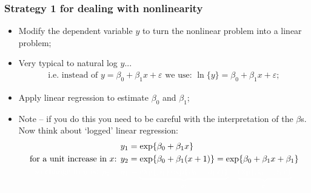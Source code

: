 \documentclass[aspectratio=169]{beamer}
\theoremstyle{principle}
\begin{document}
\begin{frame}
\frametitle{Strategy 1 for dealing with nonlinearity}

\begin{itemize}
\item Modify the dependent variable $y$ to turn the nonlinear problem into a linear problem;
\item Very typical to natural log $y$...
\begin{align*}
\mbox{i.e. instead of }y = \beta_0 + \beta_1x + \varepsilon\mbox{ we use: }\ln\{y\} = \beta_0 + \beta_1x + \varepsilon;
\end{align*}
\item Apply linear regression to estimate $\beta_0$ and $\beta_1$;
\item Note -- if you do this you need to be careful with the interpretation of the $\beta$s.  Now think about `logged' linear regression:
\begin{align*}
y_1 &= \exp\{\beta_0 + \beta_1x\}\\
\mbox{for a unit increase in $x$: } y_2 &= \exp\{\beta_0 + \beta_1(x + 1)\} = \exp\{\beta_0 + \beta_1x + \beta_1\}\\
\color{white}\mbox{so change in $y$ is: }y_2 - y_1 &\color{white}= \underbrace{\exp\{\beta_1\}\exp\{\beta_0 + \beta_1x)\}}_{y_2} - \underbrace{\exp\{\beta_0 + \beta_1x\}}_{y_1}
\end{align*}

\end{itemize}

\end{frame}
\end{document}
